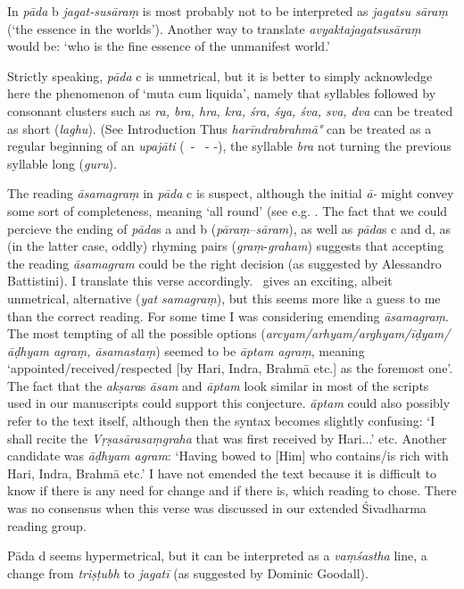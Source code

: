 {{ 
 In \textit{pāda} b \textit{jagat-susāraṃ} is most probably not 
 to be interpreted as \textit{jagatsu sāraṃ} {\rm (}`the essence in the worlds'{\rm )}.
 Another way to translate \textit{avyaktajagatsusāraṃ} would be: 
 `who is the fine essence of the unmanifest world.'
 
 Strictly speaking, \textit{pāda} c is unmetrical, but it is better to 
 simply acknowledge here the phenomenon of `muta cum liquida', namely
 that syllables followed by consonant clusters such as 
 \textit{ra, bra, hra, kra, śra, śya, śva, sva, dva} can be treated as short {\rm (}\textit{laghu}{\rm )}.
 {\rm (}See Introduction \CHECK{\rm )}
 Thus \textit{harīndrabrahmā°} can be treated as a regular beginning
 of an \textit{upajāti} {\rm (}\shortsyllable\ - \shortsyllable\ - -{\rm )}, the syllable 
 \textit{bra} not turning the previous syllable long {\rm (}\textit{guru}{\rm )}.
 
 The reading \textit{āsamagraṃ} in \textit{pāda} c is suspect,
 although the initial \textit{ā-} might convey some sort of
 completeness, meaning `all round'
 {\rm (}see e.g. .
 The fact that we could percieve
 the ending of \textit{pāda}s a and b {\rm (}\textit{pāraṃ}--\textit{sāram}{\rm )}, 
 as well as \textit{pāda}s c and d, as {\rm (}in the latter case, oddly{\rm )} rhyming pairs {\rm (}\textit{graṃ}-\textit{graham}{\rm )}
 suggests that accepting the reading
 \textit{āsamagram} could be the right decision
 {\rm (}as suggested by Alessandro Battistini{\rm )}.
 I translate this verse accordingly. \msM\ gives an exciting,
 albeit unmetrical, alternative {\rm (}\textit{yat samagraṃ}{\rm )}, but
 this seems more like a guess to me than the correct reading.
 For some time I was considering emending \textit{āsamagraṃ}.
 The most tempting of all the possible options 
 {\rm (}\textit{arcyam/arhyam/arghyam/īḍyam/āḍhyam agraṃ, āsamastaṃ}{\rm )} 
 seemed to be \textit{āptam agraṃ},
 meaning `appointed/received/respected [by Hari, Indra,
 Brahmā etc.] as the foremost one'. The fact that 
 the \textit{akṣara}s \textit{āsam} and \textit{āptam} look similar in most
 of the scripts used in our manuscripts could support this
 conjecture. \textit{āptam} could also
 possibly refer to the text itself, although then the
 syntax becomes slightly confusing: `I shall recite the
 \textit{Vṛṣasārasaṃgraha} that was first received by Hari...' etc.
 Another candidate was \textit{āḍhyam agram}:
 `Having bowed to [Him] who contains/is rich with Hari, Indra, Brahmā
 etc.' I have not emended the text because it is difficult
 to know if there is any need for change and if there is, which reading 
 to chose. There was no consensus when this verse was discussed 
 in our extended Śivadharma reading group.
 
 Pāda d seems hypermetrical, but it can be interpreted as a \textit{vaṃśastha}
 line, a change from \textit{triṣṭubh} to \textit{jagatī} {\rm (}as suggested by Dominic Goodall{\rm )}.
 }}

